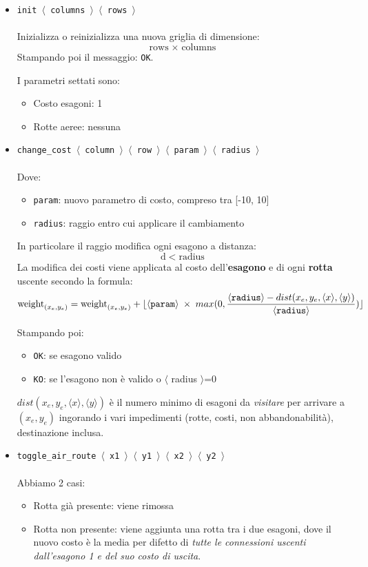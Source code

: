 \documentclass{article}
\begin{document}
\begin{itemize}
    \item \texttt{init $\langle$ columns $\rangle$ $\langle$ rows $\rangle$}\\\\
    Inizializza o reinizializza una nuova griglia di dimensione:
    \[\text{rows} \;\times\; \text{columns}\]
    Stampando poi il messaggio: \texttt{OK}.

    I parametri settati sono:
    \begin{itemize}
        \item Costo esagoni: 1
        \item Rotte aeree: nessuna
    \end{itemize}

    \item \texttt{change\_cost $\langle$ column $\rangle$ $\langle$ row $\rangle$  $\langle$ param $\rangle$ $\langle$ radius $\rangle$}\\\\
    Dove:
    \begin{itemize}
        \item \texttt{param}: nuovo parametro di costo, compreso tra [-10, 10]
        \item \texttt{radius}: raggio entro cui applicare il cambiamento
    \end{itemize}
    In particolare il raggio modifica ogni esagono a distanza:
    \[\text{d}\;<\;\text{radius}\]
    La modifica dei costi viene applicata al costo dell'\textbf{esagono} e di ogni \textbf{rotta} uscente secondo la formula:
    \[\text{weight}_{(x_e,y_e)}=\text{weight}_{(x_e,y_e)}+\lfloor \langle \text{\texttt{param}} \rangle\;\times\;max(0, \frac{\langle \text{\texttt{radius}} \rangle - dist(x_e, y_e, \langle x \rangle, \langle y \rangle)}{\langle \text{\texttt{radius}} \rangle}) \rfloor \]
    
    Stampando poi:
    \begin{itemize}
        \item \texttt{OK}: se esagono valido
        \item \texttt{KO}: se l'esagono non è valido o $\langle$ radius $\rangle$=0
    \end{itemize}
    \(dist(x_e, y_e, \langle x \rangle, \langle y \rangle)\) è il numero minimo di esagoni da \textit{visitare} per arrivare a \((x_e,y_e)\) ingorando i vari impedimenti (rotte, costi, non abbandonabilità), destinazione inclusa.

    \item \texttt{toggle\_air\_route $\langle$ x1 $\rangle$ $\langle$ y1 $\rangle$ $\langle$ x2 $\rangle$ $\langle$ y2 $\rangle$}\\\\
    Abbiamo 2 casi:
    \begin{itemize}
        \item Rotta già presente: viene rimossa
        \item Rotta non presente: viene aggiunta una rotta tra i due esagoni, dove il nuovo costo è la media per difetto di \textit{tutte le connessioni uscenti dall'esagono 1 e del suo costo di uscita}. 
    \end{itemize}


\end{itemize}
\end{document}
